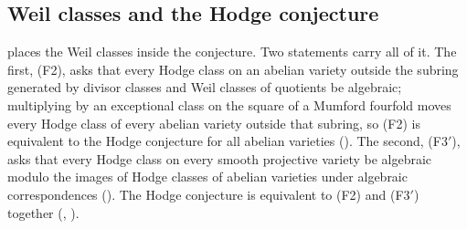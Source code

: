 \subsection{Weil classes and the Hodge conjecture}

 places the Weil classes inside the conjecture. Two
statements carry all of it. The first, (F2), asks that every Hodge class on an
abelian variety outside the subring generated by divisor classes and Weil
classes of quotients be algebraic; multiplying by an exceptional class on the
square of a Mumford fourfold moves every Hodge class of every abelian variety
outside that subring, so (F2) is equivalent to the Hodge conjecture for all
abelian varieties (). The second, (F3$'$), asks that every
Hodge class on every smooth projective variety be algebraic modulo the images
of Hodge classes of abelian varieties under algebraic correspondences
(). The Hodge conjecture is equivalent to (F2) and (F3$'$)
together (, ).

